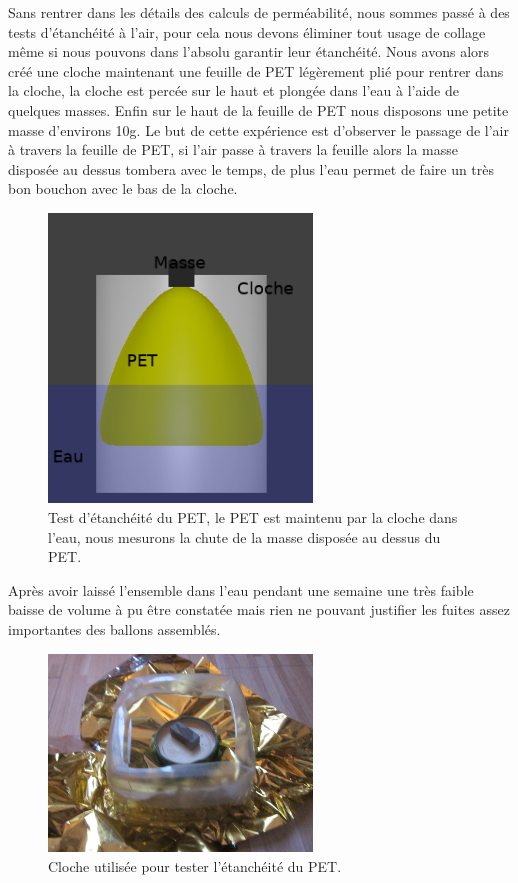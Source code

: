 \documentclass[a4paper,11pt]{article}
\begin{document}
Sans rentrer dans les détails des calculs de perméabilité, nous sommes passé à des tests d'étanchéité à l'air, pour cela nous devons éliminer tout usage de collage même si nous pouvons dans l'absolu garantir leur étanchéité.
Nous avons alors créé une cloche maintenant une feuille de PET légèrement plié pour rentrer dans la cloche, la cloche est percée sur le haut et plongée dans l'eau à l'aide de quelques masses. Enfin sur le haut de la feuille de PET nous disposons une petite masse d'environs 10g.
Le but de cette expérience est d'observer le passage de l'air à travers la feuille de PET, si l'air passe à travers la feuille alors la masse disposée au dessus tombera avec le temps, de plus l'eau permet de faire un très bon bouchon avec le bas de la cloche.

\begin{figure}[H]
	\centering
	\includegraphics[width=7cm]{../Images/etancheite.png}
	\caption{Test d'étanchéité du PET, le PET est maintenu par la cloche dans l'eau, nous mesurons la chute de la masse disposée au dessus du PET.}
\end{figure}

Après avoir laissé l'ensemble dans l'eau pendant une semaine une très faible baisse de volume à pu être constatée mais rien ne pouvant justifier les fuites assez importantes des ballons assemblés.

\begin{figure}[H]
 \centering
 \includegraphics[width=7cm]{../Images/cloche_pet.JPG}
 \caption{Cloche utilisée pour tester l'étanchéité du PET.}
\end{figure}
\end{document}
